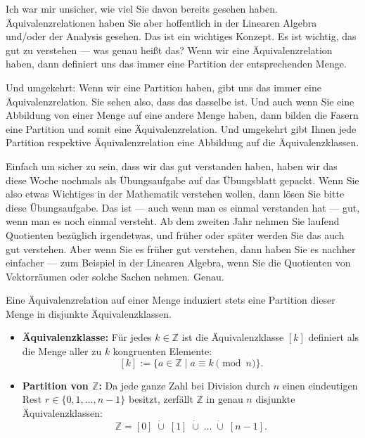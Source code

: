 \begin{spoken-clean}[00:01:57 - 00:03:17]
Ich war mir unsicher, wie viel Sie davon bereits gesehen haben. Äquivalenzrelationen haben Sie aber hoffentlich in der Linearen Algebra und/oder der Analysis gesehen. Das ist ein wichtiges Konzept. Es ist wichtig, das gut zu verstehen --- was genau heißt das? Wenn wir eine Äquivalenzrelation haben, dann definiert uns das immer eine Partition der entsprechenden Menge.

Und umgekehrt: Wenn wir eine Partition haben, gibt uns das immer eine Äquivalenzrelation. Sie sehen also, dass das dasselbe ist. Und auch wenn Sie eine Abbildung von einer Menge auf eine andere Menge haben, dann bilden die Fasern eine Partition und somit eine Äquivalenzrelation. Und umgekehrt gibt Ihnen jede Partition respektive Äquivalenzrelation eine Abbildung auf die Äquivalenzklassen.

Einfach um sicher zu sein, dass wir das gut verstanden haben, haben wir das diese Woche nochmals als Übungsaufgabe auf das Übungsblatt gepackt. Wenn Sie also etwas Wichtiges in der Mathematik verstehen wollen, dann lösen Sie bitte diese Übungsaufgabe. Das ist --- auch wenn man es einmal verstanden hat --- gut, wenn man es noch einmal versteht. Ab dem zweiten Jahr nehmen Sie laufend Quotienten bezüglich irgendetwas, und früher oder später werden Sie das auch gut verstehen. Aber wenn Sie es früher gut verstehen, dann haben Sie es nachher einfacher --- zum Beispiel in der Linearen Algebra, wenn Sie die Quotienten von Vektorräumen oder solche Sachen nehmen. Genau.
\end{spoken-clean}

\begin{math-stroke}
Eine Äquivalenzrelation auf einer Menge induziert stets eine Partition dieser Menge in disjunkte Äquivalenzklassen.
\begin{itemize}
    \item \textbf{Äquivalenzklasse:} Für jedes $k \in \mathbb{Z}$ ist die Äquivalenzklasse $[k]$ definiert als die Menge aller zu $k$ kongruenten Elemente:
    \[
    [k] := \{ a \in \mathbb{Z} \mid a \equiv k \pmod n \}.
    \]
    \item \textbf{Partition von $\mathbb{Z}$:} Da jede ganze Zahl bei Division durch $n$ einen eindeutigen Rest $r \in \{0, 1, \dots, n-1\}$ besitzt, zerfällt $\mathbb{Z}$ in genau $n$ disjunkte Äquivalenzklassen:
    \[
    \mathbb{Z} = [0] \;\dot{\cup}\; [1] \;\dot{\cup}\; \dots \;\dot{\cup}\; [n-1].
    \]
\end{itemize}
\end{math-stroke}

